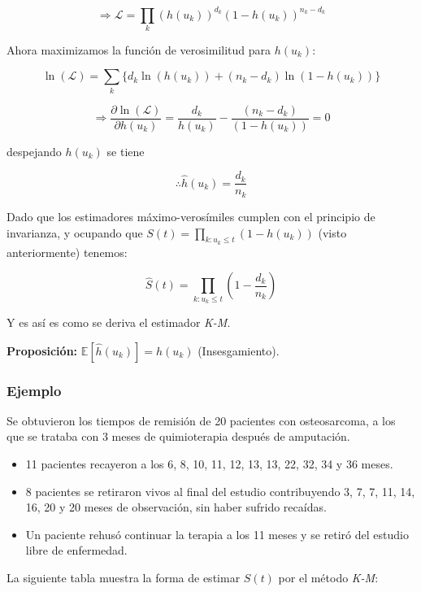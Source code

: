 \documentclass[
  a4paper,
  oneside,
  openany]{book}
\providecommand{\tightlist}{%
  \setlength{\itemsep}{0pt}\setlength{\parskip}{0pt}}
\begin{document}
\[
\Longrightarrow \mathscr{L} = \prod_{k} (h(u_k))^{d_k}(1-h(u_k))^{n_k-d_k}
\]

Ahora maximizamos la función de verosimilitud para \(h(u_k)\):

\[
\ln (\mathscr{L}) = \sum_{k}\{d_{k} \ln(h(u_{k}))+(n_{k}-d_{k}) \ln(1-h(u_{k}))\} 
\]

\[
\Longrightarrow \frac{\partial \ln (\mathscr{L})}{\partial h(u_{k})} = \frac{d_{k}}{h(u_{k})}-\frac{(n_{k}-d_{k})}{(1-h(u_{k}))} = 0
\]

despejando \(h(u_k)\) se tiene

\[
\therefore \hat{h}(u_{k}) = \frac{d_{k}}{n_{k}}
\]

Dado que los estimadores máximo-verosímiles cumplen con el principio de invarianza, y ocupando que \(S(t)=\prod_{k:u_{k}\leq t}(1-h(u_{k}))\) (visto anteriormente) tenemos:

\[
\hat S(t)=\prod_{k:u_{k}\leq t}\left(1-\frac{d_k}{n_k}\right)
\]

Y es así es como se deriva el estimador \emph{K-M}.

\textbf{Proposición:} \(\mathbb{E}[\hat{h}(u_k)] =h(u_k)\) (Insesgamiento).

\hypertarget{ejemplo-10}{%
\subsubsection*{Ejemplo}\label{ejemplo-10}}


Se obtuvieron los tiempos de remisión de 20 pacientes con osteosarcoma, a los que se trataba con 3 meses de quimioterapia después de amputación.

\begin{itemize}
\tightlist
\item
  11 pacientes recayeron a los 6, 8, 10, 11, 12, 13, 13, 22, 32, 34 y 36 meses.
\item
  8 pacientes se retiraron vivos al final del estudio contribuyendo 3, 7, 7, 11, 14, 16, 20 y 20 meses de observación, sin haber sufrido recaídas.
\item
  Un paciente rehusó continuar la terapia a los 11 meses y se retiró del estudio libre de enfermedad.
\end{itemize}

La siguiente tabla muestra la forma de estimar \(S(t)\) por el método \emph{K-M}:
\end{document}
